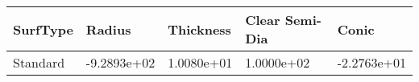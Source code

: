 \documentclass[convert={convertexe={magick.exe}}]{standalone}
\begin{document}
\begin{tabular}{lllll}
\toprule
SurfType &      Radius &  Thickness &  Clear Semi-Dia &       Conic \\
\midrule
Standard & -9.2893e+02 & 1.0080e+01 &      1.0000e+02 & -2.2763e+01 \\
\bottomrule
\end{tabular}
\end{document}
